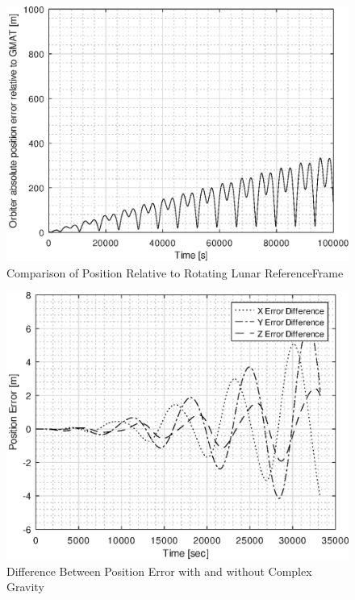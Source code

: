 \documentclass[a4paper]{article}
\begin{document}
\begin{figure}[h]
\centering
\includegraphics[width=1.0\textwidth]{position_error.eps}
\caption{Comparison of Position Relative to Rotating Lunar ReferenceFrame}
\label{fig:error}
\end{figure}

\begin{figure}[h]
\centering
\includegraphics[width=1.0\textwidth]{errordiff.eps}
\caption{Difference Between Position Error with and without Complex Gravity}
\label{fig:errordiff}
\end{figure}
\end{document}
